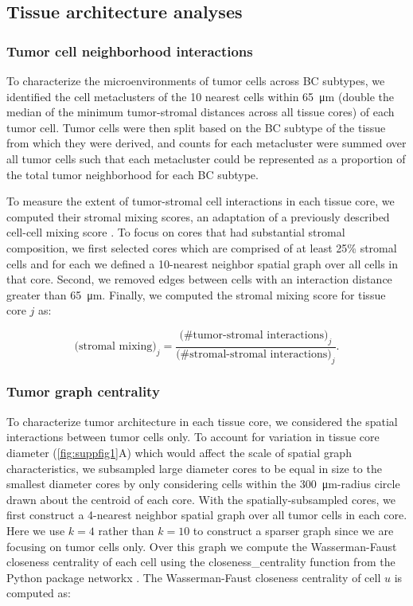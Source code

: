 \documentclass[preprint,review,3p,12pt]{elsarticle}
\begin{document}
\subsection{Tissue architecture analyses}
\subsubsection{Tumor cell neighborhood interactions}
To characterize the microenvironments of tumor cells across BC subtypes, we identified the cell metaclusters of the 10 nearest cells within \SI{65}{\micro\meter} (double the median of the minimum tumor-stromal distances across all tissue cores) of each tumor cell. Tumor cells were then split based on the BC subtype of the tissue from which they were derived, and counts for each metacluster were summed over all tumor cells such that each metacluster could be represented as a proportion of the total tumor neighborhood for each BC subtype. 

To measure the extent of tumor-stromal cell interactions in each tissue core, we computed their stromal mixing scores, an adaptation of a previously described cell-cell mixing score \cite{keren2018}. To focus on cores that had substantial stromal composition, we first selected cores which are comprised of at least 25\% stromal cells and for each we defined a 10-nearest neighbor spatial graph over all cells in that core. Second, we removed edges between cells with an interaction distance greater than \SI{65}{\micro\meter}. Finally, we computed the stromal mixing score for tissue core $j$ as:

\begin{equation}
\label{eq:sm}
\text{(stromal mixing)}_{j} = \frac{\text{(\# tumor-stromal interactions)}_{j}}{\text{(\# stromal-stromal interactions)}_{j}}.
\end{equation}

\subsubsection{Tumor graph centrality}
To characterize tumor architecture in each tissue core, we considered the spatial interactions between tumor cells only. To account for variation in tissue core diameter (\autoref{fig:suppfig1}A) which would affect the scale of spatial graph characteristics, we subsampled large diameter cores to be equal in size to the smallest diameter cores by only considering cells within the \SI{300}{\micro\meter}-radius circle drawn about the centroid of each core. With the spatially-subsampled cores, we first construct a 4-nearest neighbor spatial graph over all tumor cells in each core. Here we use $k=4$ rather than $k=10$ to construct a sparser graph since we are focusing on tumor cells only. Over this graph we compute the Wasserman-Faust closeness centrality of each cell using the closeness\_centrality function from the Python package networkx \cite{networkx2008}. The Wasserman-Faust closeness centrality of cell $u$ is computed as:
\end{document}
